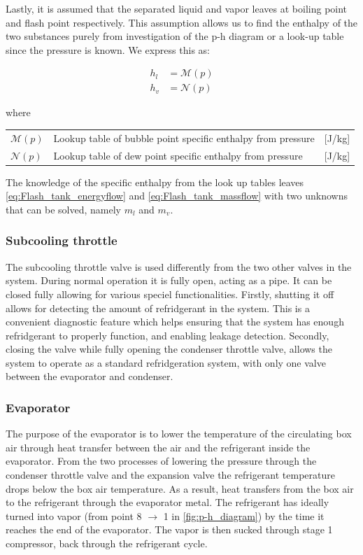 Lastly, it is assumed that the separated liquid and vapor leaves at boiling point and flash point respectively. This assumption allows us to find the enthalpy of the two substances purely from investigation of the p-h diagram or a look-up table since the pressure is known. We express this as:

\begin{align}
	h_{l}  & = \mathcal{M}(p)\\
	h_{v}  & = \mathcal{N}(p)
\end{align}

where

\begin{center}
	\begin{tabular}{l p{8cm} l}
		$\mathcal{M}(p)$ & Lookup table of bubble point specific enthalpy from pressure & [\si{J}/\si{kg}] \\
		$\mathcal{N}(p)$ & Lookup table of dew point specific enthalpy from pressure    & [\si{J}/\si{kg}]
	\end{tabular}
\end{center}

The knowledge of the specific enthalpy from the look up tables leaves \cref{eq:Flash_tank_energyflow} and \cref{eq:Flash_tank_massflow} with two unknowns that can be solved, namely $ m_l $ and $ m_v $.

\subsubsection{Subcooling throttle}
The subcooling throttle valve is used differently from the two other valves in the system. During normal operation it is fully open, acting as a pipe. It can be closed fully allowing for various speciel functionalities. Firstly, shutting it off allows for detecting the amount of refridgerant in the system. This is a convenient diagnostic feature which helps ensuring that the system has enough refridgerant to properly function, and enabling leakage detection. Secondly, closing the valve while fully opening the condenser throttle valve, allows the system to operate as a standard refridgeration system, with only one valve between the evaporator and condenser.


\subsubsection{Evaporator}
The purpose of the evaporator is to lower the temperature of the circulating box air through heat transfer between the air and the refrigerant inside the evaporator. From the two processes of lowering the pressure through the condenser throttle valve and the expansion valve the refrigerant temperature drops below the box air temperature. As a result, heat transfers from the box air to the refrigerant through the evaporator metal. The refrigerant has ideally turned into vapor (from point 8 $\rightarrow$ 1 in \cref{fig:p-h_diagram}) by the time it reaches the end of the evaporator. The vapor is then sucked through stage 1 compressor, back through the refrigerant cycle.

